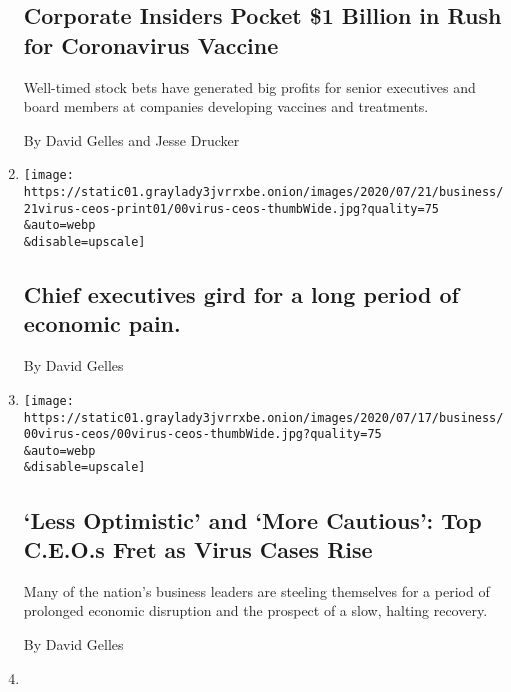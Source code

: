 \begin{enumerate}
  \hypertarget{corporate-insiders-pocket-1-billion-in-rush-for-coronavirus-vaccine}{%
  \subsection{Corporate Insiders Pocket \$1 Billion in Rush for
  Coronavirus
  Vaccine}\label{corporate-insiders-pocket-1-billion-in-rush-for-coronavirus-vaccine}}

  Well-timed stock bets have generated big profits for senior executives
  and board members at companies developing vaccines and treatments.

  By David Gelles and Jesse Drucker
\item
  \href{/live/2020/07/20/business/stock-market-today-coronavirus/chief-executives-gird-for-a-long-period-of-economic-pain}{}

  \texttt{[image: https://static01.graylady3jvrrxbe.onion/images/2020/07/21/business/21virus-ceos-print01/00virus-ceos-thumbWide.jpg?quality=75\\\&auto=webp\\\&disable=upscale]}

  \hypertarget{chief-executives-gird-for-a-long-period-of-economic-pain}{%
  \subsection{Chief executives gird for a long period of economic
  pain.}\label{chief-executives-gird-for-a-long-period-of-economic-pain}}

  By David Gelles
\item
  \href{/2020/07/20/business/coronavirus-ceos-economy.html}{}

  \texttt{[image: https://static01.graylady3jvrrxbe.onion/images/2020/07/17/business/00virus-ceos/00virus-ceos-thumbWide.jpg?quality=75\\\&auto=webp\\\&disable=upscale]}

  \hypertarget{less-optimistic-and-more-cautious-top-ceos-fret-as-virus-cases-rise}{%
  \subsection{`Less Optimistic' and `More Cautious': Top C.E.O.s Fret as
  Virus Cases
  Rise}\label{less-optimistic-and-more-cautious-top-ceos-fret-as-virus-cases-rise}}

  Many of the nation's business leaders are steeling themselves for a
  period of prolonged economic disruption and the prospect of a slow,
  halting recovery.

  By David Gelles
\item
  \href{/2020/07/12/business/matt-mullenweg-automattic-corner-office.html}{}


\end{enumerate}
